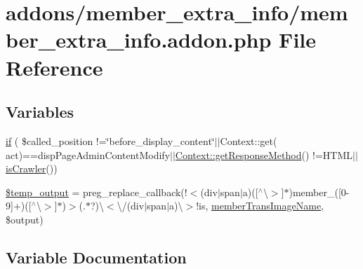 \hypertarget{member__extra__info_8addon_8php}{}\section{addons/member\+\_\+extra\+\_\+info/member\+\_\+extra\+\_\+info.addon.\+php File Reference}
\label{member__extra__info_8addon_8php}
\subsection*{Variables}
\begin{DoxyCompactItemize}
\item 
\hyperlink{member__extra__info_8addon_8php_a343bf9bf16148d253aa65319de0b3f16}{if} ( \$called\+\_\+position !=\char`\"{}before\+\_\+display\+\_\+content\char`\"{}$\vert$$\vert$Context\+::get( \textquotesingle{}act\textquotesingle{})==\textquotesingle{}disp\+Page\+Admin\+Content\+Modify\textquotesingle{}$\vert$$\vert$\hyperlink{classContext_a1d02a15209360034cd719d8b08cb5061}{Context\+::get\+Response\+Method}() !=\textquotesingle{}H\+T\+ML\textquotesingle{}$\vert$$\vert$\hyperlink{func_8inc_8php_a490ffbd4821da1995c76c381553d5b3d}{is\+Crawler}())
\item 
\hyperlink{member__extra__info_8addon_8php_a5866ef6f77cbeaf87d8208cf805bbc3d}{\$temp\+\_\+output} = preg\+\_\+replace\+\_\+callback(\textquotesingle{}!$<$(div$\vert$span$\vert$a)(\mbox{[}$^\wedge$\textbackslash{}$>$\mbox{]}$\ast$)member\+\_\+(\mbox{[}0-\/9\mbox{]}+)(\mbox{[}$^\wedge$\textbackslash{}$>$\mbox{]}$\ast$)$>$(.$\ast$?)\textbackslash{}$<$\textbackslash{}/(div$\vert$span$\vert$a)\textbackslash{}$>$!is\textquotesingle{}, \textquotesingle{}\hyperlink{member__extra__info_8lib_8php_a21882e797e0da66aed32f1cf3053eaf2}{member\+Trans\+Image\+Name}\textquotesingle{}, \$output)
\end{DoxyCompactItemize}


\subsection{Variable Documentation}
\mbox{\label{member__extra__info_8addon_8php_a5866ef6f77cbeaf87d8208cf805bbc3d}} 
